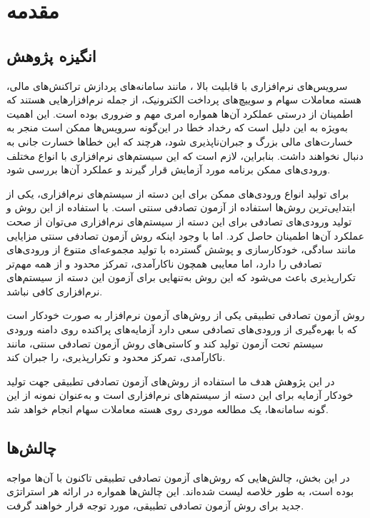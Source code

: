 
\chapter{مقدمه}\label{chapter1}
\section{انگیزه پژوهش}
سرویس‌های نرم‌افزاری با قابلیت بالا \cite{dyson2004architecting}، مانند سامانه‌های پردازش تراکنش‌های مالی، هسته معاملات سهام و سوییچ‌های پرداخت الکترونیک، از جمله نرم‌افزارهایی هستند که اطمینان از درستی عملکرد آن‌ها همواره امری مهم و ضروری بوده است. این اهمیت به‌ویژه به این دلیل است که رخداد خطا در این‌گونه سرویس‌ها ممکن است منجر به خسارت‌های مالی بزرگ و جبران‌ناپذیری شود، هرچند که این خطاها خسارت جانی به دنبال نخواهند داشت. بنابراین، لازم است که این سیستم‌های نرم‌افزاری با انواع مختلف ورودی‌های ممکن برنامه مورد آزمایش قرار گیرند و عملکرد آن‌ها بررسی شود.

برای تولید انواع ورودی‌های ممکن برای این دسته از سیستم‌های نرم‌افزاری، یکی از ابتدایی‌ترین روش‌ها استفاده از آزمون تصادفی سنتی
\cite{hamlet1994random}
 است. با استفاده از این روش و تولید ورودی‌های تصادفی برای این دسته از سیستم‌های نرم‌افزاری می‌توان از صحت عملکرد آن‌ها اطمینان حاصل کرد. اما با وجود اینکه روش آزمون تصادفی سنتی مزایایی مانند سادگی، خودکارسازی و پوشش گسترده با تولید مجموعه‌ای متنوع از ورودی‌های تصادفی را دارد، اما معایبی همچون ناکارآمدی، تمرکز محدود و از همه مهم‌تر تکرارپذیری باعث می‌شود که این روش به‌تنهایی برای آزمون این دسته از سیستم‌های نرم‌افزاری کافی نباشد.

روش آزمون تصادفی تطبیقی
\cite{huang2019survey}
 یکی از روش‌های آزمون نرم‌افزار به صورت خودکار است که با بهره‌گیری از ورودی‌های تصادفی سعی دارد آزمایه‌های پراکنده روی دامنه ورودی سیستم تحت آزمون تولید کند و کاستی‌های روش آزمون تصادفی سنتی، مانند ناکارآمدی، تمرکز محدود و تکرارپذیری، را جبران کند.

در این پژوهش هدف ما استفاده از روش‌های آزمون تصادفی تطبیقی جهت تولید خودکار آزمایه برای این دسته از سیستم‌های نرم‌افزاری است و به‌عنوان نمونه از این گونه سامانه‌ها، یک مطالعه موردی روی هسته معاملات سهام انجام خواهد شد.

\section{چالش‌ها}

در این بخش، چالش‌هایی که روش‌های آزمون تصادفی تطبیقی تاکنون با آن‌ها مواجه بوده است، به طور خلاصه لیست شده‌اند. این چالش‌ها همواره در ارائه هر استراتژی جدید برای روش آزمون تصادفی تطبیقی، مورد توجه قرار خواهند گرفت.

